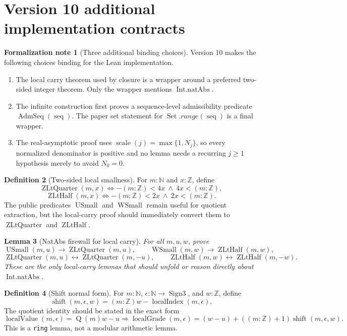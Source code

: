 \documentclass[11pt]{article}
\theoremstyle{definition}
\newtheorem{definition}{Definition}[section]
\newtheorem{formalnote}[definition]{Formalization note}
\theoremstyle{plain}
\newtheorem{lemma}[definition]{Lemma}
\theoremstyle{remark}
\newcommand{\N}{\mathbb{N}}
\newcommand{\Z}{\mathbb{Z}}
\newcommand{\Set}{\operatorname{Set}}
\newcommand{\Sgn}{\operatorname{Sign3}}
\newcommand{\Qfun}{\operatorname{Q}}
\newcommand{\LGrade}{\operatorname{localGrade}}
\newcommand{\LIndex}{\operatorname{localIndex}}
\newcommand{\LVal}{\operatorname{localValue}}
\newcommand{\USmall}{\operatorname{USmall}}
\newcommand{\WSmall}{\operatorname{WSmall}}
\newcommand{\seq}{\operatorname{seq}}
\newcommand{\Scale}{\operatorname{scale}}
\newcommand{\ZLtQuarter}{\operatorname{ZLtQuarter}}
\newcommand{\ZLtHalf}{\operatorname{ZLtHalf}}
\newcommand{\Shift}{\operatorname{shift}}
\newcommand{\AdmSeq}{\operatorname{AdmSeq}}
\begin{document}
\section{Version 10 additional implementation contracts}\label{sec:v10-contracts}

\begin{formalnote}[Three additional binding choices]
Version 10 makes the following choices binding for the Lean implementation.
\begin{enumerate}[label=(\arabic*), leftmargin=*]
\item The local carry theorem used by closure is a wrapper around a preferred two-sided integer theorem.  Only the wrapper mentions \(\operatorname{Int.natAbs}\).
\item The infinite construction first proves a sequence-level admissibility predicate \(\AdmSeq(\seq)\).  The paper set statement for \(\Set.range(\seq)\) is a final wrapper.
\item The real-asymptotic proof uses \(\Scale(j)=\max\{1,N_j\}\), so every normalized denominator is positive and no lemma needs a recurring \(j\ge1\) hypothesis merely to avoid \(N_0=0\).
\end{enumerate}
\end{formalnote}

\begin{definition}[Two-sided local smallness]\label{def:v10-zsmall}
For \(m:\N\) and \(x:\Z\), define
\[
        \ZLtQuarter(m,x)\Longleftrightarrow -(m:\Z)<4x\ \wedge\ 4x<(m:\Z),
\]
\[
        \ZLtHalf(m,x)\Longleftrightarrow -(m:\Z)<2x\ \wedge\ 2x<(m:\Z).
\]
The public predicates \(\USmall\) and \(\WSmall\) remain useful for quotient extraction, but the local-carry proof should immediately convert them to \(\ZLtQuarter\) and \(\ZLtHalf\).
\end{definition}

\begin{lemma}[NatAbs firewall for local carry]\label{lem:v10-natabs-firewall}
For all \(m,u,w\), prove
\[
        \USmall(m,u)\to\ZLtQuarter(m,u),
        \qquad
        \WSmall(m,w)\to\ZLtHalf(m,w),
\]
\[
        \ZLtQuarter(m,u)\leftrightarrow \ZLtQuarter(m,-u),
        \qquad
        \ZLtHalf(m,w)\leftrightarrow \ZLtHalf(m,-w).
\]
These are the only local-carry lemmas that should unfold or reason directly about \(\operatorname{Int.natAbs}\).
\end{lemma}

\begin{definition}[Shift normal form]\label{def:v10-shift}
For \(m:\N\), \(\epsilon:\N\to\Sgn\), and \(w:\Z\), define
\[
        \Shift(m,\epsilon,w)=(m:\Z)w-\LIndex(m,\epsilon).
\]
The quotient identity should be stated in the exact form
\[
        \LVal(m,\epsilon)=\Qfun(m)w-u
        \Longrightarrow
        \LGrade(m,\epsilon)=(w-u)+((m:\Z)+1)\Shift(m,\epsilon,w).
\]
This is a \verb|ring| lemma, not a modular arithmetic lemma.
\end{definition}
\end{document}
